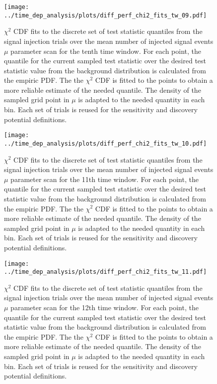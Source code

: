 \begin{figure}[H]
  \centering
  \texttt{[image: ../time\_dep\_analysis/plots/diff\_perf\_chi2\_fits\_tw\_09.pdf]}
  \caption[$\chi^2$ CDF fits for the 10th time window differential performance]{
     $\chi^2$ CDF fits to the discrete set of test statistic quantiles from the signal injection trials over the mean number of injected signal events $\mu$ parameter scan for the tenth time window.
     For each point, the quantile for the current sampled test statistic over the desired test statistic value from the background distribution is calculated from the empiric PDF.
     The the $\chi^2$ CDF is fitted to the points to obtain a more reliable estimate of the needed quantile.
     The density of the sampled grid point in $\mu$ is adapted to the needed quantity in each bin.
     Each set of trials is reused for the sensitivity and discovery potential definitions.
  }
  \label{fig:diff_perf_chi2_fits_tw_09}
\end{figure}
\begin{figure}[H]
  \centering
  \texttt{[image: ../time\_dep\_analysis/plots/diff\_perf\_chi2\_fits\_tw\_10.pdf]}
  \caption[$\chi^2$ CDF fits for the 11th time window differential performance]{
     $\chi^2$ CDF fits to the discrete set of test statistic quantiles from the signal injection trials over the mean number of injected signal events $\mu$ parameter scan for the 11th time window.
     For each point, the quantile for the current sampled test statistic over the desired test statistic value from the background distribution is calculated from the empiric PDF.
     The the $\chi^2$ CDF is fitted to the points to obtain a more reliable estimate of the needed quantile.
     The density of the sampled grid point in $\mu$ is adapted to the needed quantity in each bin.
     Each set of trials is reused for the sensitivity and discovery potential definitions.
  }
  \label{fig:diff_perf_chi2_fits_tw_10}
\end{figure}
\begin{figure}[H]
  \centering
  \texttt{[image: ../time\_dep\_analysis/plots/diff\_perf\_chi2\_fits\_tw\_11.pdf]}
  \caption[$\chi^2$ CDF fits for the 12th time window differential performance]{
     $\chi^2$ CDF fits to the discrete set of test statistic quantiles from the signal injection trials over the mean number of injected signal events $\mu$ parameter scan for the 12th time window.
     For each point, the quantile for the current sampled test statistic over the desired test statistic value from the background distribution is calculated from the empiric PDF.
     The the $\chi^2$ CDF is fitted to the points to obtain a more reliable estimate of the needed quantile.
     The density of the sampled grid point in $\mu$ is adapted to the needed quantity in each bin.
     Each set of trials is reused for the sensitivity and discovery potential definitions.
  }
  \label{fig:diff_perf_chi2_fits_tw_11}
\end{figure}
